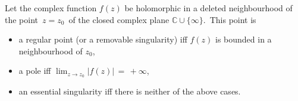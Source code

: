 \documentclass[12pt]{article}
\theoremstyle{definition}
\begin{document}
Let the complex function $f(z)$ be holomorphic in a deleted neighbourhood of the point\, $z = z_0$\, of the closed complex plane
$\mathbb{C}\cup\{\infty\}$.\, This point is
\begin{itemize}
\item a regular point (or a removable singularity) iff $f(z)$ is bounded in a neighbourhood of $z_0$,
\item a pole iff\; $\displaystyle\lim_{z \to z_0}|f(z)| \,=\, +\infty$,
\item an essential singularity iff there is neither of the above cases.
\end{itemize}
\end{document}
